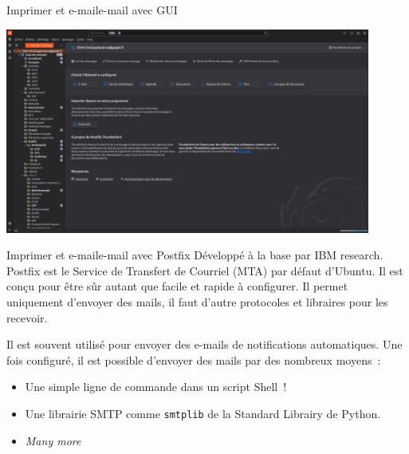 \documentclass{beamer}
\begin{document}
    \begin{frame}{Imprimer et e-mail}{e-mail avec GUI}
        \begin{center}
            \includegraphics[width=12cm]{image/thunderbird}
        \end{center}
    \end{frame}

    \begin{frame}{Imprimer et e-mail}{e-mail avec Postfix}
        Développé à la base par IBM research.
        \bigbreak
        Postfix est le Service de Transfert de Courriel (MTA) par défaut d'Ubuntu.
        Il est conçu pour être sûr autant que facile et rapide à configurer.
        Il permet uniquement d'envoyer des mails, il faut d'autre protocoles et libraires pour les recevoir.

        Il est souvent utilisé pour envoyer des e-mails de notifications automatiques.
        \bigbreak
        Une fois configuré, il est possible d'envoyer des mails par des nombreux moyens~:
        \begin{itemize}
            \item Une simple ligne de commande dans un script Shell~!
            \item Une librairie SMTP comme \lstinline{smtplib} de la Standard Librairy de Python.
            \item \textit{Many more}
        \end{itemize}
    \end{frame}
\end{document}
